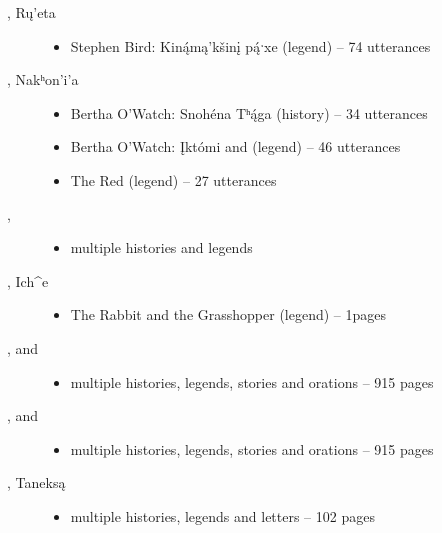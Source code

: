 \documentclass[output=paper]{LSP/langsci}
\begin{document}
\begin{description}

\item[\citet{Carter1991}, Rų’eta]\hfill
\begin{itemize}
\item Stephen Bird: Kin\'ąmą’kšinį p\'ąˑxe (legend) -- 74 utterances
\end{itemize}

\item[\citet{Cumberland2005}, Nakʰon’i’a]\hfill
\begin{itemize}
\item Bertha O’Watch: Snohéna Tʰ\'ąga (history) -- 34 utterances
\item Bertha O’Watch: Įktómi and  (legend) -- 46 utterances
\item The Red  (legend) -- 27 utterances
\end{itemize}

\item[\citet{Deloria1932}, ]\hfill
\begin{itemize}
\item multiple histories and legends
\end{itemize}

\item[\citet{Dorsey1880},  Ich\^{}e]\hfill
\begin{itemize}
\item The Rabbit and the Grasshopper (legend) -- 1\textonehalf{}pages
\end{itemize}

\item[\citet{Dorsey1890},  and ]\hfill
\begin{itemize}
\item multiple histories, legends, stories and orations -- 915 pages
\end{itemize}

\item[\citet{Dorsey1891},  and ]\hfill
\begin{itemize}
\item multiple histories, legends, stories and orations -- 915 pages
\end{itemize}

\item[\citet{DorseySwanton1912}, Taneksą]\hfill
\begin{itemize}
\item multiple histories, legends and letters -- 102 pages
\end{itemize}


\end{description}
\end{document}

